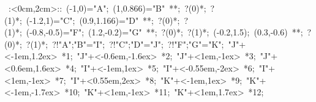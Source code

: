 \hbox{
\xy    <2cm,0cm>:<0cm,2cm>::
       (-1,0)="A"; (1,0.866)="B" **\dir{-}; ?(0)*\dir{<}; ?(1)*\dir{>};
       (-1.2,1)="C"; (0.9,1.166)="D" **\dir{-}; ?(0)*\dir{<}; ?(1)*\dir{>};
       (-0.8,-0.5)="F"; (1.2,-0.2)="G" **\dir{-}; ?(0)*\dir{<}; ?(1)*\dir{>};
       (-0.2,1.5); (0.3,-0.6) **\dir{-}; ?(0)*\dir{<}; ?(1)*\dir{>};
       ?!{"A";"B"}="I";  ?!{"C";"D"}="J";  ?!{"F";"G"}="K";
       "J"+<-1em,1.2ex> *{1};
       "J"+<-0.6em,-1.6ex> *{2};
       "J"+<1em,-1ex> *{3};
       "J"+<0.6em,1.6ex> *{4};
       "I"+<-1em,1ex> *{5};
       "I"+<-0.55em,-2ex> *{6};
       "I"+<1em,-1ex> *{7};
       "I"+<0.55em,2ex> *{8};
       "K"+<-1em,1ex> *{9};
       "K"+<-1em,-1.7ex> *{10};
       "K"+<1em,-1ex> *{11};
       "K"+<1em,1.7ex> *{12};
\endxy}

